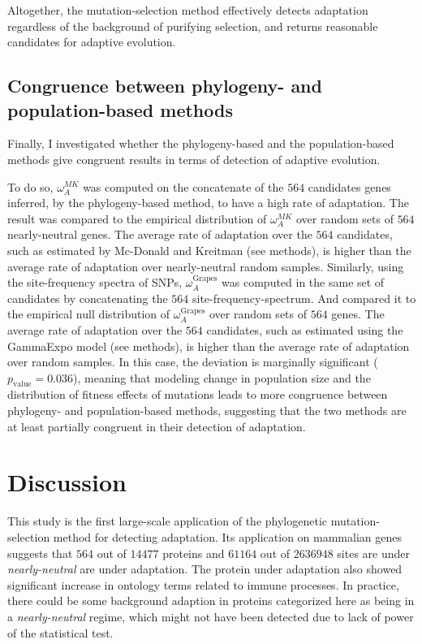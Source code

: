 \documentclass{article}
\begin{document}
Altogether, the mutation-selection method effectively detects adaptation regardless of the background of purifying selection, and returns reasonable candidates for adaptive evolution.


\subsection*{Congruence between phylogeny- and population-based methods}
Finally, I investigated whether the phylogeny-based and the population-based methods give congruent results in terms of detection of adaptive evolution.

To do so, $\omega_A^{MK}$ was computed on the concatenate of the $564$ candidates genes inferred, by the phylogeny-based method, to have a high rate of adaptation.
The result was compared to the empirical distribution of $\omega_A^{MK}$ over random sets of $564$ nearly-neutral genes.
The average rate of adaptation over the $564$ candidates, such as estimated by Mc-Donald and Kreitman (see methods), is higher than the average rate of adaptation over nearly-neutral random samples.
Similarly, using the site-frequency spectra of SNPs, $\omega_A^{\text{Grapes}}$ was computed in the same set of candidates by concatenating the $564$ site-frequency-spectrum.
And compared it to the empirical null distribution of $\omega_A^{\text{Grapes}}$ over random sets of $564$ genes.
The average rate of adaptation over the $564$ candidates, such as estimated using the GammaExpo model (see methods), is higher than the average rate of adaptation over random samples.
In this case, the deviation is marginally significant ($p_{\mathrm{value}}=0.036$),
meaning that modeling change in population size and the distribution of fitness effects of mutations leads to more congruence between phylogeny- and population-based methods, suggesting that the two methods are at least partially congruent in their detection of adaptation.

\section*{Discussion}

This study is the first large-scale application of the phylogenetic mutation-selection method for detecting adaptation.
Its application on mammalian genes suggests that $564$ out of $14477$ proteins and $61164$ out of $2636948$ sites are under \textit{nearly-neutral} are under adaptation.
The protein under adaptation also showed significant increase in ontology terms related to immune processes.
In practice, there could be some background adaption in proteins categorized here as being in a \textit{nearly-neutral} regime, which might not have been detected due to lack of power of the statistical test.
\end{document}

